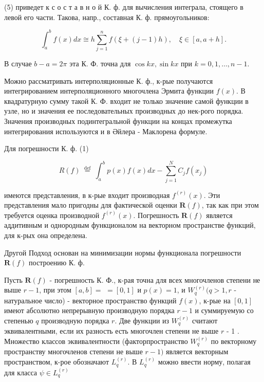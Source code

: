 \documentclass[10pt]{article}
\begin{document}
(5) приведет к с о с т а в н о й К. ф. для вычисления интеграла, стоящего в левой его части. Такова, напр., составная К. ф. прямоугольников:



\[

\int_{a}^{b} f(x) d x \cong h \sum_{j=1}^{n} f(\xi+(j-1) h), \quad \xi \in[a, a+h] .

\]



В случае $b-a=2 \pi$ эта $К$. Ф. точна для $\cos k x, \sin k x$ при $k=0,1, \ldots, n-1$.



Можно рассматривать интерполяционные К. ф., к-рые получаются интегрированием интерполяционного многочлена Эрмита функции $f(x)$. В квадратурную сумму такой К. Ф. входит не только значение самой функции в узле, но и значения ее последовательных производных до нек-рого порядка. Значения производных подинтегральной функции на концах промежутка интегрирования используются и в Әйлера - Маклорена формуле.



Для погрешности К. ф. (1)



\[

R(f) \stackrel{\text { def }}{=} \int_{a}^{b} p(x) f(x) d x-\sum_{j=1}^{N} C_{j} f\left(x_{j}\right)

\]



имеются представления, в к-рые входит производная $f^{(r)}(x)$. Эти представления мало пригодны для фактической оценки $\boldsymbol{R}(f)$, так как при этом требуется оценка производной $f^{(r)}(x)$. Погрешность $\boldsymbol{R}(f)$ является аддитивным и однородным функционалом на векторном пространстве функций, для к-рых она определена.



Другой Подход основан на минимизации нормы функционала погрешности $\boldsymbol{R}(f)$ построению К. ф.



Пусть $\boldsymbol{R}(f)$ - погрешность К. Ф., к-рая точна для всех многочленов степени не выше $r-1$, при этом $[a, b]=$ $=[0,1]$ и $p(x)=1$, и $W_{q}^{(r)}(q>1, r$ - натуральное число) - векторное пространство функций $f(x)$, к-рые на $[0,1]$ имеют абсолютно непрерывную производную порядка $r-1$ и суммируемую со степенью $q$ производную порядка $r$. Две функции из $W_{q}^{(r)}$ считают эквивалентными, если их разность есть многочлен степени не выше $r$ - 1 . Множество классов эквивалентности (факторпространство $W_{q}^{(r)}$ по векторному пространству многочленов степени не выше $r-1)$ является векторным пространством, к-рое обозначают $L_{q}^{(r)}$. В $L_{q}^{(r)}$ можно ввести норму, полагая для класса $\psi \in L_{q}^{(r)}$
\end{document}
